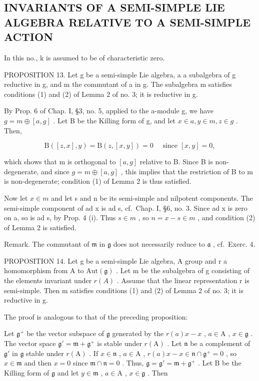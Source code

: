 \subsection{INVARIANTS OF A SEMI-SIMPLE LIE ALGEBRA RELATIVE TO A SEMI-SIMPLE ACTION}

In this no., k is assumed to be of characteristic zero.

PROPOSITION 13. Let g be a semi-simple Lie algebra, a a subalgebra of g reductive in g, and m the commutant of a in g. The subalgebra m satisfies conditions (1) and (2) of Lemma 2 of no. 3; it is reductive in g.

By Prop. 6 of Chap. I, §3, no. 5, applied to the a-module g, we have \(g = m \oplus [a, g]\) . Let B be the Killing form of g, and let \(x \in a, y \in m, z \in g\) . Then,

\[
\mathrm{B} ([ z, x ], y) = \mathrm{B} (z, [ x, y ]) = 0 \quad \text { since } [ x, y ] = 0,
\]

which shows that m is orthogonal to \([a,g]\) relative to B. Since B is non-degenerate, and since \(g = m \oplus [a,g]\) , this implies that the restriction of B to m is non-degenerate; condition (1) of Lemma 2 is thus satisfied.

Now let \(x \in m\) and let s and n be its semi-simple and nilpotent components. The semi-simple component of ad x is ad s, cf.~Chap. I, §6, no. 3. Since ad x is zero on a, so is ad s, by Prop. 4 (i). Thus \(s \in m\) , so \(n = x - s \in m\) , and condition (2) of Lemma 2 is satisfied.

Remark. The commutant of \(\mathfrak{m}\) in \(\mathfrak{g}\) does not necessarily reduce to \(\mathfrak{a}\) , cf.~Exerc. 4.

PROPOSITION 14. Let g be a semi-simple Lie algebra, A group and r a homomorphism from A to \(\text{Aut}(\mathfrak{g})\) . Let m be the subalgebra of g consisting of the elements invariant under \(r(A)\) . Assume that the linear representation r is semi-simple. Then m satisfies conditions (1) and (2) of Lemma 2 of no. 3; it is reductive in g.

The proof is analogous to that of the preceding proposition:

Let \(\mathfrak{g}^{+}\) be the vector subspace of \(\mathfrak{g}\) generated by the \(r(a)x - x\) , \(a \in \mathrm{A}\) , \(x \in \mathfrak{g}\) . The vector space \(\mathfrak{g}' = \mathfrak{m} + \mathfrak{g}^{+}\) is stable under \(r(\mathrm{A})\) . Let \(\mathfrak{n}\) be a complement of \(\mathfrak{g}'\) in \(\mathfrak{g}\) stable under \(r(\mathrm{A})\) . If \(x \in \mathfrak{n}\) , \(a \in \mathrm{A}\) , \(r(a)x - x \in \mathfrak{n} \cap \mathfrak{g}^{+} = 0\) , so \(x \in \mathfrak{m}\) and then \(x = 0\) since \(\mathfrak{m} \cap \mathfrak{n} = 0\) . Thus, \(\mathfrak{g} = \mathfrak{g}' = \mathfrak{m} + \mathfrak{g}^{+}\) . Let B be the Killing form of \(\mathfrak{g}\) and let \(y \in \mathfrak{m}\) , \(a \in \mathrm{A}\) , \(x \in \mathfrak{g}\) . Then

